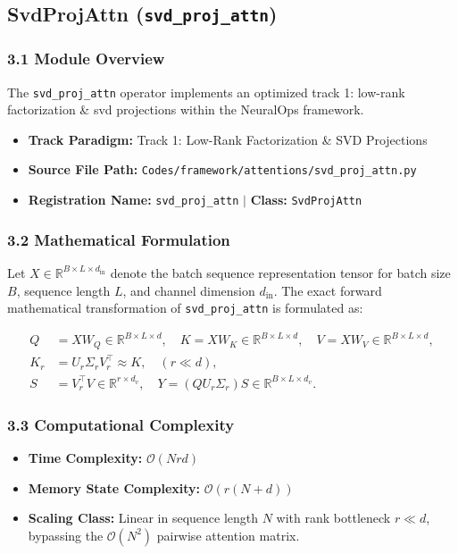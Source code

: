 \subsection{SvdProjAttn (\texttt{svd\_proj\_attn})}
\label{sec:app_module_svd_proj_attn}

\subsubsection*{3.1 Module Overview}
The \texttt{svd\_proj\_attn} operator implements an optimized track 1: low-rank factorization \& svd projections within the NeuralOps framework.
\begin{itemize}
    \item \textbf{Track Paradigm:} Track 1: Low-Rank Factorization \& SVD Projections
    \item \textbf{Source File Path:} \texttt{Codes/framework/attentions/svd\_proj\_attn.py}
    \item \textbf{Registration Name:} \texttt{svd\_proj\_attn} $\mid$ \textbf{Class:} \texttt{SvdProjAttn}
\end{itemize}

\subsubsection*{3.2 Mathematical Formulation}
Let $X \in \mathbb{R}^{B \times L \times d_{\text{in}}}$ denote the batch sequence representation tensor for batch size $B$, sequence length $L$, and channel dimension $d_{\text{in}}$. The exact forward mathematical transformation of \texttt{svd\_proj\_attn} is formulated as:

\begin{align}
Q &= X W_Q \in \mathbb{R}^{B \times L \times d}, \quad K = X W_K \in \mathbb{R}^{B \times L \times d}, \quad V = X W_V \in \mathbb{R}^{B \times L \times d}, \\
K_r &= U_r \Sigma_r V_r^\top \approx K, \quad (r \ll d), \\
S &= V_r^\top V \in \mathbb{R}^{r \times d_v}, \quad Y = (Q U_r \Sigma_r) S \in \mathbb{R}^{B \times L \times d_v}.
\end{align}


\subsubsection*{3.3 Computational Complexity}
\begin{itemize}
    \item \textbf{Time Complexity:} $\mathcal{O}(N r d)$
    \item \textbf{Memory State Complexity:} $\mathcal{O}(r(N + d))$
    \item \textbf{Scaling Class:} Linear in sequence length $N$ with rank bottleneck $r \ll d$, bypassing the $\mathcal{O}(N^2)$ pairwise attention matrix.
\end{itemize}

